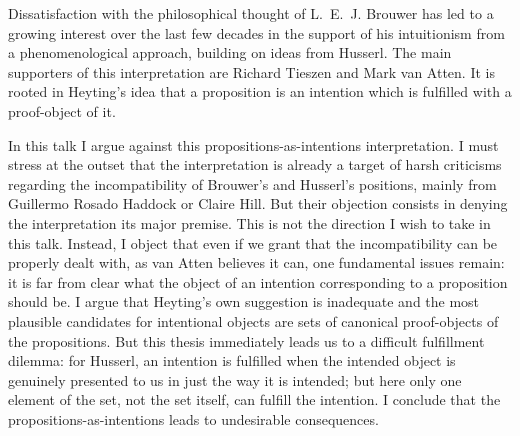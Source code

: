\documentclass{article}
\begin{document}
Dissatisfaction with the philosophical thought of L.~E.~J. Brouwer has led to a growing interest over the last few decades in the
support of his intuitionism from a phenomenological approach, building on ideas from Husserl. The main supporters of this interpretation are Richard Tieszen and Mark van Atten. It is rooted in Heyting's idea that a proposition is an intention which is fulfilled with a proof-object of it. 

In this talk I argue against this propositions-as-intentions interpretation. I must stress at the outset that the interpretation is already a target of harsh criticisms regarding the incompatibility of Brouwer's and Husserl's positions, mainly from Guillermo Rosado Haddock or Claire Hill. But their objection consists in denying the interpretation its major premise. 
This is not the direction I wish to take in this talk. Instead, I object that even if we grant that the incompatibility can be properly dealt with, as van Atten believes it can, one fundamental issues remain: it is far from clear what the object of an intention corresponding to a proposition should be. I argue that Heyting's own suggestion is inadequate and the most plausible candidates for intentional objects are sets of canonical proof-objects of the propositions. But this thesis immediately leads us to a difficult fulfillment dilemma: for Husserl, an intention is fulfilled when the intended object is genuinely presented to us in just the way it is intended; but here only one element of the set, not the set itself, can fulfill the intention. I conclude that the propositions-as-intentions leads to undesirable consequences. 
\end{document}
